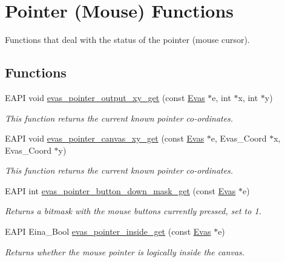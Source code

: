 \section{Pointer (Mouse) Functions}
\label{group__Evas__Pointer__Group}


Functions that deal with the status of the pointer (mouse cursor).  


\subsection*{Functions}
\begin{DoxyCompactItemize}
\item 
EAPI void \hyperlink{group__Evas__Pointer__Group_gad8e78aded475fe26ea14b7410f510a98}{evas\_\-pointer\_\-output\_\-xy\_\-get} (const \hyperlink{group__Evas__Canvas_ga5ff87cc4ce6bc43e3b640a6d37f73043}{Evas} $\ast$e, int $\ast$x, int $\ast$y)
\begin{DoxyCompactList}\small\item\em This function returns the current known pointer co-\/ordinates. \item\end{DoxyCompactList}\item 
EAPI void \hyperlink{group__Evas__Pointer__Group_ga2f7bf87c9b1268e68c85d4bb8b9e4b15}{evas\_\-pointer\_\-canvas\_\-xy\_\-get} (const \hyperlink{group__Evas__Canvas_ga5ff87cc4ce6bc43e3b640a6d37f73043}{Evas} $\ast$e, Evas\_\-Coord $\ast$x, Evas\_\-Coord $\ast$y)
\begin{DoxyCompactList}\small\item\em This function returns the current known pointer co-\/ordinates. \item\end{DoxyCompactList}\item 
EAPI int \hyperlink{group__Evas__Pointer__Group_gaae658f627d7f31b051345e45377c3580}{evas\_\-pointer\_\-button\_\-down\_\-mask\_\-get} (const \hyperlink{group__Evas__Canvas_ga5ff87cc4ce6bc43e3b640a6d37f73043}{Evas} $\ast$e)
\begin{DoxyCompactList}\small\item\em Returns a bitmask with the mouse buttons currently pressed, set to 1. \item\end{DoxyCompactList}\item 
EAPI Eina\_\-Bool \hyperlink{group__Evas__Pointer__Group_ga39a1840fd43442c20f321437bd5f427a}{evas\_\-pointer\_\-inside\_\-get} (const \hyperlink{group__Evas__Canvas_ga5ff87cc4ce6bc43e3b640a6d37f73043}{Evas} $\ast$e)
\begin{DoxyCompactList}\small\item\em Returns whether the mouse pointer is logically inside the canvas. \item\end{DoxyCompactList}\end{DoxyCompactItemize}


